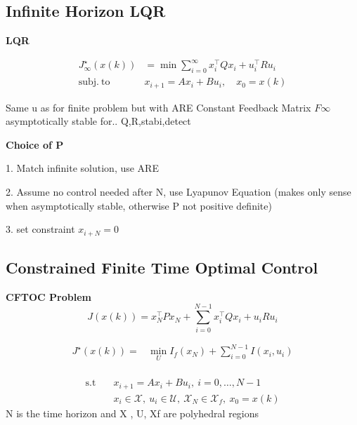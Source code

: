 \subsection{Infinite Horizon LQR}
\begin{sstTitleBox}[ForestGreen]{\center\textbf{\large
			LQR
		}
	}

	\[ \begin{aligned}
			J_\infty^\star(x(k))  & = \min \sum_{i=0}^\infty
			x_i^\top Q x_i + u_i^\top R u_i                                   \\
			\mathrm{subj.\ to }\  & x_{i+1} = Ax_i + Bu_i,\quad    x_0 = x(k)
		\end{aligned} \]

	Same u as for finite problem but with ARE
	Constant  Feedback Matrix $F\infty$
	asymptotically stable for.. Q,R,stabi,detect


\end{sstTitleBox}

\textbf{Choice of P}

1. Match infinite solution, use ARE

2. Assume no control needed after N, use Lyapunov Equation %
(makes only sense when asymptotically stable, otherwise P not positive definite)

3. set constraint $x_{i+N}=0$

\subsection{Constrained Finite Time Optimal Control
}

\begin{sstTitleBox}[ForestGreen]{\textbf{\large
			CFTOC Problem
		}
	}
	\[
		J(x(k)) = x_N^\top P x_N + \sum_{i=0}^{N-1}x_i^\top Q x_i + u_i R u_i
	\]
	\begin{centering}
		\begin{sstFrame}[ForestGreen]
			\vspace{-1.5mm}
			\color{white}
			\[ \begin{aligned}
					J^\star (x(k)) = & \min_{U}  I_f(x_N) + \sum_{i=0}^{N-1} I(x_{i}, u_{i}) \\
				\end{aligned} \]
			\vspace{-2.5mm}
		\end{sstFrame}
		\[ \begin{aligned}
				\text{s.t} \quad & x_{i+1} = A x_{i} + Bu_{i},\ i = 0,\dots,N-1                                                  \\
				                 & x_{i} \in \mathcal{X},\ u_{i} \in \mathcal{U},\ \mathcal{X}_N \in \mathcal{X}_f, \ x_0 = x(k)
			\end{aligned} \]
		N is the time horizon and X , U, Xf are polyhedral regions
	\end{centering}
\end{sstTitleBox}

